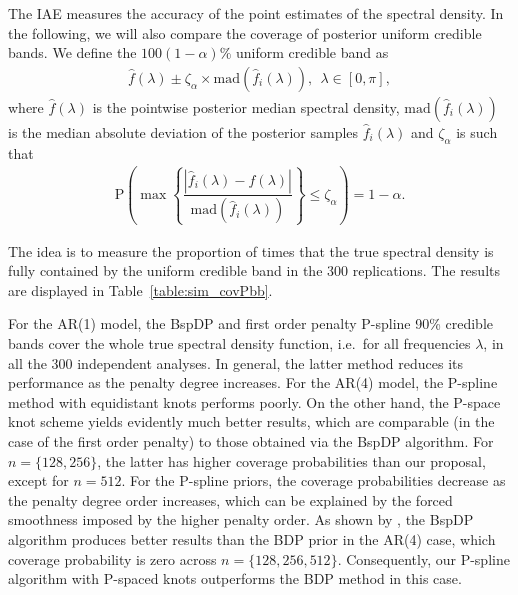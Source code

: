 \documentclass[twocolumn,final]{svjour3}
\begin{document}

The IAE measures the accuracy of the  point estimates of the spectral density. In the following, we will also compare the coverage of posterior uniform credible bands.
We define the $100(1-\alpha)\%$ uniform credible band as
\begin{align*}
\widehat{f}(\lambda) \pm \zeta_\alpha \times \text{mad} \left( \widehat{f}_i (\lambda) \right), \:\: \lambda \in [0,\pi],
\end{align*}
where $\widehat{f}(\lambda)$ is the pointwise posterior median spectral density, $\text{mad}( \widehat{f}_i (\lambda))$ is the median absolute deviation of the posterior samples $\widehat{f}_i (\lambda)$ and $\zeta_\alpha$ is such that
\begin{align*}
\text{P}\left( \max \left\{ \dfrac{|\widehat{f}_i (\lambda) - \widehat{f} (\lambda)|}{\text{mad}(\widehat{f}_i (\lambda))} \right\} \leq \zeta_{\alpha} \right) = 1 - \alpha.
\end{align*}

The idea is to measure the proportion of times that the true spectral density is fully contained by the uniform credible band in the 300 replications.  The results are displayed in Table~\ref{table:sim_covPbb}.

For the AR(1) model, the BspDP and first order penalty P-spline 90\% credible bands cover the whole true spectral density function, i.e.\ for all frequencies $\lambda$, in all the 300 independent analyses.  In general, the latter method reduces its performance as the penalty degree increases.  For the AR(4) model, the P-spline method with equidistant knots performs poorly.  On the other hand, the P-space knot scheme yields evidently much better results, which are comparable (in the case of the first order penalty) to those obtained via the BspDP algorithm.  For $n=\{128,256\}$, the latter has higher coverage probabilities than our proposal, except for $n=512$.  For the P-spline priors, the coverage probabilities decrease as the penalty degree order increases, which can be explained by the forced smoothness imposed by the higher penalty order.  As shown by \cite{Edwards2018}, the BspDP algorithm produces better results than the BDP prior in the AR(4) case, which coverage probability is zero across $n=\{128,256,512\}$. Consequently, our P-spline algorithm with P-spaced knots outperforms the BDP method in this case.
\end{document}

